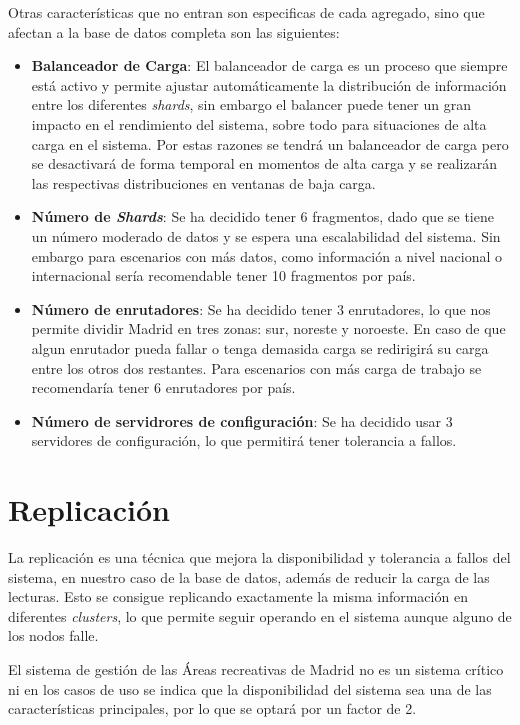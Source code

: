 \documentclass[]{article}
\begin{document}
Otras características que no entran son especificas de cada agregado, sino que afectan a la base de datos completa son las siguientes:
\begin{itemize}
    \item \textbf{Balanceador de Carga}: El balanceador de carga es un proceso que siempre está activo y permite ajustar automáticamente la distribución de información entre los diferentes \textit{shards}, sin embargo el balancer puede tener un gran impacto en el rendimiento del sistema, sobre todo para situaciones de alta carga en el sistema. Por estas razones se tendrá un balanceador de carga pero se desactivará de forma temporal en momentos de alta carga y se realizarán las respectivas distribuciones en ventanas de baja carga.
    \item \textbf{Número de \textit{Shards}}: Se ha decidido tener 6 fragmentos, dado que se tiene un número moderado de datos y se espera una escalabilidad del sistema. Sin embargo para escenarios con más datos, como información a nivel nacional o internacional sería recomendable tener 10 fragmentos por país.
    \item \textbf{Número de enrutadores}: Se ha decidido tener 3 enrutadores, lo que nos permite dividir Madrid en tres zonas: sur, noreste y noroeste. En caso de que algun enrutador pueda fallar o tenga demasida carga se redirigirá su carga entre los otros dos restantes. Para escenarios con más carga de trabajo se recomendaría tener 6 enrutadores por país.
    \item \textbf{Número de servidrores de configuración}: Se ha decidido usar 3 servidores de configuración, lo que permitirá tener tolerancia a fallos.
\end{itemize}

\section{Replicación}
\label{sec:replicacion}

La replicación es una técnica que mejora la disponibilidad y tolerancia a fallos del sistema, en nuestro caso de la base de datos, además de reducir la carga de las lecturas. Esto se consigue replicando exactamente la misma información en diferentes \textit{clusters}, lo que permite seguir operando en el sistema aunque alguno de los nodos falle.

El sistema de gestión de las Áreas recreativas de Madrid no es un sistema crítico ni en los casos de uso se indica que la disponibilidad del sistema sea una de las características principales, por lo que se optará por un factor de 2.
\end{document}
